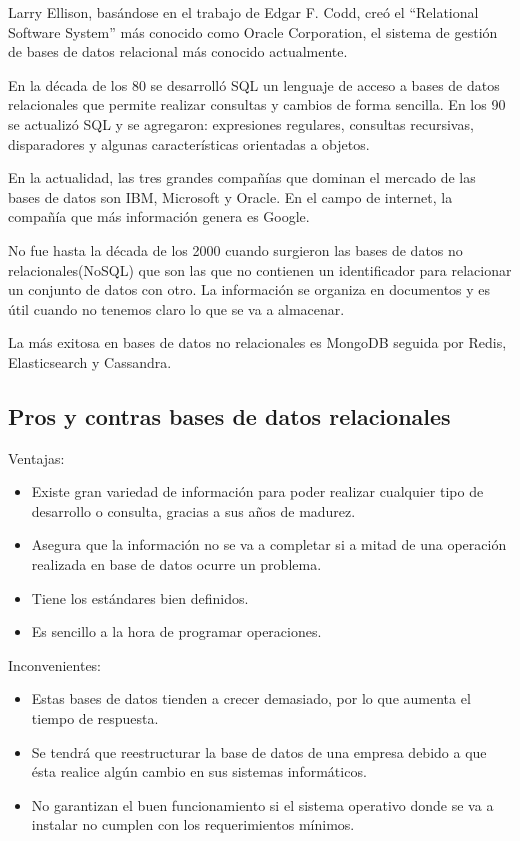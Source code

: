 \documentclass[12pt]{report} %
\begin{document}
	Larry Ellison, basándose en el trabajo de Edgar F. Codd, creó el “Relational Software System” más conocido como Oracle Corporation, el sistema de gestión de bases de datos relacional más conocido actualmente.
	
	En la década de los 80 se desarrolló SQL un lenguaje de acceso a bases de datos relacionales que permite realizar consultas y cambios de forma sencilla. En los 90 se actualizó SQL y se agregaron: expresiones regulares, consultas recursivas, disparadores y algunas características orientadas a objetos.
	
	En la actualidad, las tres grandes compañías que dominan el mercado de las bases de datos son IBM, Microsoft y Oracle. En el campo de internet, la compañía que más información genera es Google.
	
	No fue hasta la década de los 2000 cuando surgieron las bases de datos no relacionales(NoSQL) que son las que no contienen un identificador para relacionar un conjunto de datos con otro. La información se organiza en documentos y es útil cuando no tenemos claro lo que se va a almacenar.
	
	La más exitosa en bases de datos no relacionales es MongoDB seguida por Redis, Elasticsearch y Cassandra.
	
	\subsection{Pros y contras bases de datos relacionales}
	Ventajas:
	 \begin{itemize}
		\item Existe gran variedad de información para poder realizar cualquier tipo de desarrollo o consulta, gracias a sus años de madurez.
		\item Asegura que la información no se va a completar si a mitad de una operación realizada en base de datos ocurre un problema.
		\item Tiene los estándares bien definidos.
		\item Es sencillo a la hora de programar operaciones.
	\end{itemize}
	Inconvenientes:
		 \begin{itemize}
		\item Estas bases de datos tienden a crecer demasiado, por lo que aumenta el tiempo de respuesta.
		\item Se tendrá que reestructurar la base de datos de una empresa debido a que ésta realice algún cambio en sus sistemas informáticos.
		\item No garantizan el buen funcionamiento si el sistema operativo donde se va a instalar no cumplen con los requerimientos mínimos.
	\end{itemize}
\end{document}
